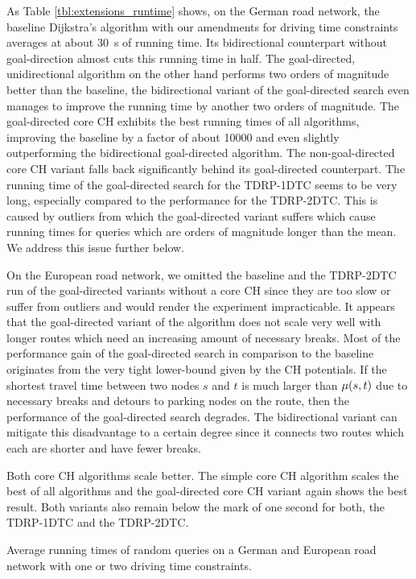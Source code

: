 As Table \ref{tbl:extensions_runtime} shows, on the German road network, the baseline Dijkstra's algorithm with our amendments for driving time constraints averages at about \SI{30}{\second} of running time. Its bidirectional counterpart without goal-direction almost cuts this running time in half. The goal-directed, unidirectional algorithm on the other hand performs two orders of magnitude better than the baseline, the bidirectional variant of the goal-directed search even manages to improve the running time by another two orders of magnitude. The goal-directed core CH exhibits the best running times of all algorithms, improving the baseline by a factor of about \num{10000} and even slightly outperforming the bidirectional goal-directed algorithm. The non-goal-directed core CH variant falls back significantly behind its goal-directed counterpart. The running time of the goal-directed search for the TDRP-1DTC seems to be very long, especially compared to the performance for the TDRP-2DTC. This is caused by outliers from which the goal-directed variant suffers which cause running times for queries which are orders of magnitude longer than the mean. We address this issue further below.

On the European road network, we omitted the baseline and the TDRP-2DTC run of the goal-directed variants without a core CH since they are too slow or suffer from outliers and would render the experiment impracticable. It appears that the goal-directed variant of the algorithm does not scale very well with longer routes which need an increasing amount of necessary breaks. Most of the performance gain of the goal-directed search in comparison to the baseline originates from the very tight lower-bound given by the CH potentials. If the shortest travel time between two nodes $s$ and $t$ is much larger than $\mu(s,t)$ due to necessary breaks and detours to parking nodes on the route, then the performance of the goal-directed search degrades. The bidirectional variant can mitigate this disadvantage to a certain degree since it connects two routes which each are shorter and have fewer breaks.

Both core CH algorithms scale better. The simple core CH algorithm scales the best of all algorithms and the goal-directed core CH variant again shows the best result. Both variants also remain below the mark of one second for both, the TDRP-1DTC and the TDRP-2DTC.

\begin{table}[btp]
	\centering
	
	\caption{Average running times of random queries on a German and European road network with one or two driving time constraints.}
	\label{tbl:extensions_runtime}
\end{table}

